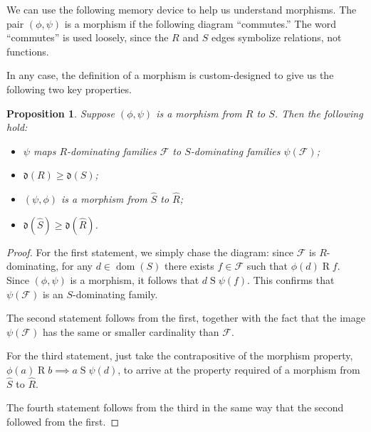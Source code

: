 \documentclass[11pt,oneside]{amsbook}
\DeclareMathOperator{\dom}{dom}
\DeclareMathOperator{\cod}{cod}
\theoremstyle{definition}
\theoremstyle{plain}
\newtheorem{proposition}[theorem]{Proposition}
\theoremstyle{definition}
\theoremstyle{remark}
\numberwithin{equation}{section}
\numberwithin{figure}{section}
\begin{document}
We can use the following memory device to help us understand morphisms. The pair $(\phi,\psi)$ is a morphism if the following diagram ``commutes.'' The word ``commutes'' is used loosely, since the $R$ and $S$ edges symbolize relations, not functions.
\begin{center}
\end{center}
In any case, the definition of a morphism is custom-designed to give us the following two key properties.

\begin{proposition}
  \label{prop:morphism}
  Suppose $(\phi,\psi)$ is a morphism from $R$ to $S$. Then the following hold:
  \begin{itemize}
    \item $\psi$ maps $R$-dominating families $\mathcal F$ to $S$-dominating families $\psi(\mathcal F)$;
    \item $\mathfrak d(R)\geq\mathfrak d(S)$;
    \item $(\psi,\phi)$ is a morphism from $\hat S$ to $\hat R$;
    \item $\mathfrak d(\hat S)\geq\mathfrak d(\hat R)$.
  \end{itemize}
\end{proposition}

\begin{proof}
  For the first statement, we simply chase the diagram: since $\mathcal F$ is $R$-dominating, for any $d\in\dom(S)$ there exists $f\in\mathcal F$ such that $\phi(d)\mathrel{R}f$. Since $(\phi,\psi)$ is a morphism, it follows that $d\mathrel{S}\psi(f)$. This confirms that $\psi(\mathcal F)$ is an $S$-dominating family.

  The second statement follows from the first, together with the fact that the image $\psi(\mathcal F)$ has the same or smaller cardinality than $\mathcal F$.

  For the third statement, just take the contrapositive of the morphism property, $\phi(a)\mathrel R b\implies a\mathrel S\psi(d)$, to arrive at the property required of a morphism from $\hat S$ to $\hat R$.

  The fourth statement follows from the third in the same way that the second followed from the first.
\end{proof}
\end{document}

